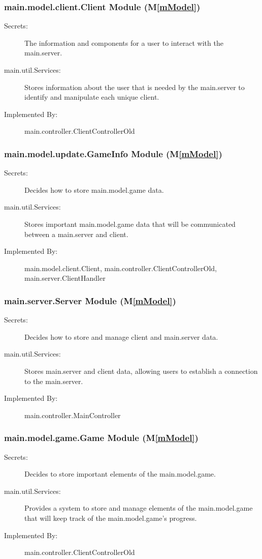 \documentclass[12pt, titlepage]{article}
\newcommand{\mref}[1]{M\ref{#1}}
\begin{document}
\subsubsection{ main.model.client.Client Module (\mref{mModel})}
    \begin{description}
    \item[Secrets:] The information and components for a user to interact with the main.server.
    \item[main.util.Services:] Stores information about the user that is needed by the main.server to identify and manipulate each unique client.
    \item[Implemented By:] main.controller.ClientControllerOld
    \end{description}

\subsubsection{ main.model.update.GameInfo Module (\mref{mModel})}
    \begin{description}
    \item[Secrets:] Decides how to store main.model.game data.
    \item[main.util.Services:] Stores important main.model.game data that will be communicated between a main.server and client.
    \item[Implemented By:] main.model.client.Client, main.controller.ClientControllerOld, main.server.ClientHandler
    \end{description}

\subsubsection{ main.server.Server Module (\mref{mModel})}
    \begin{description}
    \item[Secrets:] Decides how to store and manage client and main.server data.
    \item[main.util.Services:] Stores main.server and client data, allowing users to establish a connection to the main.server.
    \item[Implemented By:] main.controller.MainController
    \end{description}

\subsubsection{ main.model.game.Game Module (\mref{mModel})}
    \begin{description}
    \item[Secrets:] Decides to store important elements of the main.model.game.
    \item[main.util.Services:] Provides a system to store and manage elements of the main.model.game that will keep track of the main.model.game's progress.
    \item[Implemented By:] main.controller.ClientControllerOld
    \end{description}
\end{document}

